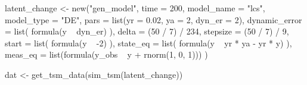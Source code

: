   latent_change <- new("gen_model",
      time = 200,
      model_name = "lcs",
      model_type = "DE",
      pars = list(yr = 0.02, ya = 2, dyn_er = 2),
      dynamic_error = list(
          formula(y ~ dyn_er)
      ),
      delta = (50 / 7) / 234,
      stepsize = (50 / 7) / 9,
      start = list(
          formula(y ~ -2)
      ),
      state_eq = list(
          formula(y ~ yr * ya - yr * y)
      ),
      meas_eq = list(formula(y_obs ~ y + rnorm(1, 0, 1)))
  )

dat <- get_tsm_data(sim_tsm(latent_change))
